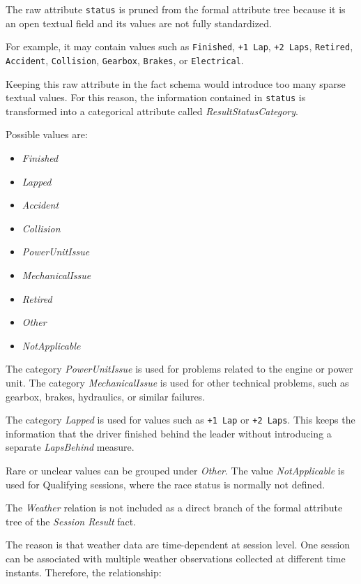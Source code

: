 \documentclass[a4paper,11pt]{article}
\begin{document}
	
	The raw attribute \texttt{status} is pruned from the formal attribute tree because it is an
	open textual field and its values are not fully standardized.
	
	For example, it may contain values such as \texttt{Finished}, \texttt{+1 Lap},
	\texttt{+2 Laps}, \texttt{Retired}, \texttt{Accident}, \texttt{Collision},
	\texttt{Gearbox}, \texttt{Brakes}, or \texttt{Electrical}.
	
	Keeping this raw attribute in the fact schema would introduce too many sparse textual
	values. For this reason, the information contained in \texttt{status} is transformed into
	a categorical attribute called \textit{ResultStatusCategory}.
	
	Possible values are:
	
	\begin{itemize}
		\item \textit{Finished}
		\item \textit{Lapped}
		\item \textit{Accident}
		\item \textit{Collision}
		\item \textit{PowerUnitIssue}
		\item \textit{MechanicalIssue}
		\item \textit{Retired}
		\item \textit{Other}
		\item \textit{NotApplicable}
	\end{itemize}
	
	The category \textit{PowerUnitIssue} is used for problems related to the engine or power
	unit. The category \textit{MechanicalIssue} is used for other technical problems, such as
	gearbox, brakes, hydraulics, or similar failures.
	
	The category \textit{Lapped} is used for values such as \texttt{+1 Lap} or
	\texttt{+2 Laps}. This keeps the information that the driver finished behind the leader
	without introducing a separate \textit{LapsBehind} measure.
	
	Rare or unclear values can be grouped under \textit{Other}. The value
	\textit{NotApplicable} is used for Qualifying sessions, where the race status is normally
	not defined.
	

	
	The \textit{Weather} relation is not included as a direct branch of the formal attribute
	tree of the \textit{Session Result} fact.
	
	The reason is that weather data are time-dependent at session level. One session can be
	associated with multiple weather observations collected at different time instants.
	Therefore, the relationship:
	
\end{document}
